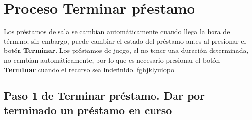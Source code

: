 \chapter{Proceso Terminar pŕestamo}
	Los préstamos de sala se cambian automáticamente cuando llega la hora 
	de término; sin embargo, puede cambiar el estado del préstamo antes
	al presionar el botón \textbf{Terminar}. Los préstamos de juego, al 
	no tener una duración determinada, no cambian automáticamente, por lo que es necesario presionar  el botón \textbf{Terminar} cuando el 
	recurso sea indefinido. fghjklyuiopo

\section{Paso 1 de Terminar préstamo. 
	Dar por terminado un préstamo en curso}
	
